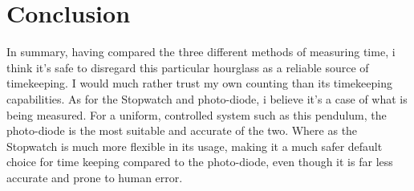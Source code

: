 \documentclass[%
 reprint,
 amsmath,amssymb,
 aps,
]{revtex4-1}
\begin{document}
\section{Conclusion}
	In summary, having compared the three different methods of measuring time, i think it's safe to disregard this particular hourglass as a reliable source of timekeeping. I would much rather trust my own counting than its timekeeping capabilities. As for the Stopwatch and photo-diode, i believe it's a case of what is being measured. For a uniform, controlled system such as this pendulum, the photo-diode is the most suitable and accurate of the two. Where as the Stopwatch is much more flexible in its usage, making it a much safer default choice for time keeping compared to the photo-diode, even though it is far less accurate and prone to human error.


\end{document}
